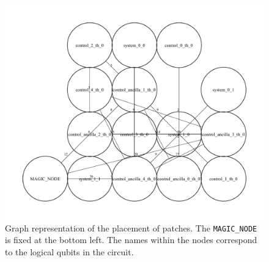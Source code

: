 \documentclass[a4paper,11pt]{ltjsarticle}
\begin{document}
{{        \begin{figure}[h]
            \centering
            \includegraphics[scale=0.40]{figure/initial_state.pdf}
            \vspace{0pt}\caption{Graph representation of the placement of patches. The \texttt{MAGIC\_NODE} is fixed at the bottom left. The names within the nodes correspond to the logical qubits in the circuit.}
            \label{mapped_circuit_graph}
            \vspace{-10pt}
        \end{figure}

        \begin{table}[h]
            \centering
            \caption{(Left column) Names of the logical qubits (nodes). (Right column) Each entry consists of the instruction number, qubit 1, qubit 2, and the weight of the edges, separated by spaces.}
            \label{circuit_to_be_optimized}
        \end{table}
        \clearpage
    }

}
\end{document}
